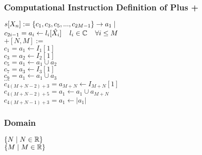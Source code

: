 \documentclass[11pt]{article}
\begin{document}
\subsubsection{Computational Instruction Definition of Plus +}
\begin{center}
\vspace{4mm}
$
s[X_n] := \{c_1,c_3,c_5,...,c_{2M-1}\} \rightarrow a_{1} \hspace{1mm} |
$
\\ \vspace{3mm}
$
c_{2i -1}= a_i \leftarrow l_i[\hat{X_i}]  \hspace{4mm} l_i \in \mathbb{C} \hspace{4mm} \forall i \leq M
$
\\ \vspace{8mm}
$
+[N,M] :=
$
\\ \vspace{2mm}
$
c_1 = a_1 \leftarrow I_1[1]
$
\\ \vspace{2mm}
$
c_3 = a_2 \leftarrow I_2[1]
$
\\ \vspace{2mm}
$
c_5 = a_1 \leftarrow a_1 \cup a_2
$
\\ \vspace{2mm}
$
c_7 = a_3 \leftarrow I_3[1]
$
\\ \vspace{2mm}
$
c_9 = a_1 \leftarrow a_1 \cup a_3
$
\\ \vspace{2mm}
$
...
$
\\ \vspace{2mm}
$
c_{4(M+N-2)+3} = a_{M+N} \leftarrow I_{M+N}[1]
$
\\ \vspace{2mm}
$
c_{4(M+N-2)+5} = a_1 \leftarrow a_1 \cup a_{M+N}
$
\\ \vspace{2mm}
$
c_{4(M+N-1)+3} = a_1 \leftarrow |a_1|
$
\end{center}
\subsubsection{Domain}
\begin{center}
$
\{N \hspace{1mm} | \hspace{1mm} N \in \mathbb{R}\}
$
\\ \vspace{2mm}
$
\{M \hspace{1mm} | \hspace{1mm} M \in \mathbb{R}\}
$
\end{center}
\end{document}

